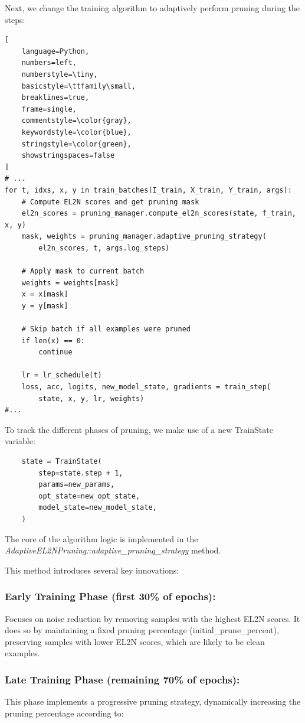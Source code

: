 \documentclass{article}
\begin{document}
Next, we change the training algorithm to adaptively perform pruning during the steps:
\begin{lstlisting}[
    language=Python,
    numbers=left,
    numberstyle=\tiny,
    basicstyle=\ttfamily\small,
    breaklines=true,
    frame=single,
    commentstyle=\color{gray},
    keywordstyle=\color{blue},
    stringstyle=\color{green},
    showstringspaces=false
]
# ...
for t, idxs, x, y in train_batches(I_train, X_train, Y_train, args):
    # Compute EL2N scores and get pruning mask
    el2n_scores = pruning_manager.compute_el2n_scores(state, f_train, x, y)
    mask, weights = pruning_manager.adaptive_pruning_strategy(
        el2n_scores, t, args.log_steps)

    # Apply mask to current batch
    weights = weights[mask]
    x = x[mask]
    y = y[mask]

    # Skip batch if all examples were pruned
    if len(x) == 0:
        continue

    lr = lr_schedule(t)
    loss, acc, logits, new_model_state, gradients = train_step(
        state, x, y, lr, weights)
#...
\end{lstlisting}

To track the different phases of pruning, we make use of a new TrainState variable:

\begin{verbatim}
    state = TrainState(
        step=state.step + 1,
        params=new_params,
        opt_state=new_opt_state,
        model_state=new_model_state,
    )
\end{verbatim}

The core of the algorithm logic is implemented in the \textit{AdaptiveEL2NPruning::adaptive\_pruning\_strategy} method. 

This method introduces several key innovations:

\subsubsection{Early Training Phase (first 30\% of epochs):}
Focuses on noise reduction by removing samples with the highest EL2N scores. It does so by maintaining a fixed pruning percentage (initial\_prune\_percent), preserving samples with lower EL2N scores, which are likely to be clean examples.

\subsubsection{Late Training Phase (remaining 70\% of epochs):}
This phase implements a progressive pruning strategy, dynamically increasing the pruning percentage according to: 
\end{document}
